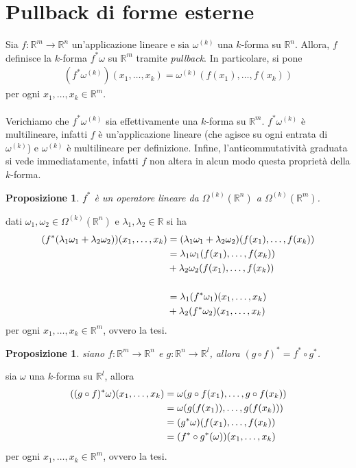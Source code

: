 \documentclass[oneside, 11pt]{amsbook}
\makeatletter
\newcommand{\0}{{(0)}}
\newcommand{\3}{{(3)}}
\theoremstyle{colonplain}
\newtheorem{prop}[thm]{Proposizione}
\theoremstyle{colondefinition}
\theoremstyle{colonremark}
\numberwithin{equation}{chapter}
\renewcommand{\proofname}{Dimostrazione}
\renewenvironment{proof}[1][\proofname]{\par
  \pushQED{\qed}%
  \normalfont \topsep6\p@\@plus6\p@\relax
  \trivlist
  \item[\hskip\labelsep\bfseries #1:]\ignorespaces
}{%
  \popQED\endtrivlist\@endpefalse
}
\makeatother
\begin{document}
\section{Pullback di forme esterne}
Sia $f : \mathbb{R}^m \longrightarrow \mathbb{R}^n$ un'applicazione lineare e sia $\omega^{(k)}$ una $k$-forma su $\mathbb{R}^n$. Allora, $f$ definisce la $k$-forma $f^*\omega$ su $\mathbb{R}^m$ tramite \textit{pullback}. In particolare, si pone
\begin{align}
    (f^*\omega^{(k)})(x_1, \dots, x_k) = \omega^{(k)}(f(x_1), \dots, f(x_k)) 
\end{align}
per ogni $x_1, \dots, x_k \in \mathbb{R}^m$. \\ \\
Verichiamo che $f^*\omega^{(k)}$ sia effettivamente una $k$-forma su $\mathbb{R}^m$. $f^*\omega^{(k)}$ è multilineare, infatti $f$ è un'applicazione lineare (che agisce su ogni entrata di $\omega^{(k)}$) e $\omega^{(k)}$ è multilineare per definizione. Infine, l'anticommutatività graduata si vede immediatamente, infatti $f$ non altera in alcun modo questa proprietà della $k$-forma.
\begin{prop} $f^*$ è un operatore lineare da $\Omega^{(k)}(\mathbb{R}^n)$ a $\Omega^{(k)}(\mathbb{R}^m)$.
\end{prop}
\begin{proof} dati $\omega_1, \omega_2 \in \Omega^{(k)}(\mathbb{R}^n)$ e $\lambda_1, \lambda_2 \in \mathbb{R}$ si ha
\begin{align}
    (f^*(\lambda_1\omega_1 + \lambda_2\omega_2))(x_1, \dots, x_k) &= (\lambda_1\omega_1 + \lambda_2\omega_2)(f(x_1), \dots, f(x_k)) \notag \\
    &= \lambda_1\omega_1(f(x_1), \dots, f(x_k)) \notag \\
    &+ \lambda_2\omega_2(f(x_1), \dots, f(x_k)) \notag \\ \notag \\
    &= \lambda_1(f^*\omega_1)(x_1, \dots, x_k) \notag \\
    &+ \lambda_2(f^*\omega_2)(x_1, \dots, x_k) 
\end{align}
per ogni $x_1, \dots, x_k \in \mathbb{R}^m$, ovvero la tesi.
\end{proof}
\begin{prop} siano $f : \mathbb{R}^m \longrightarrow \mathbb{R}^n$ e $g : \mathbb{R}^n \longrightarrow \mathbb{R}^l$, allora $(g \circ f)^* = f^* \circ g^*$.
\end{prop}
\begin{proof} sia $\omega$ una $k$-forma su $\mathbb{R}^l$, allora 
\begin{align}
    ((g \circ f)^*\omega)(x_1, \dots, x_k) &= \omega(g \circ f(x_1), \dots, g \circ f(x_k)) \notag \\
    &= \omega(g(f(x_1)), \dots, g(f(x_k))) \notag \\
    &= (g^*\omega)(f(x_1), \dots, f(x_k)) \notag \\
    &= (f^* \circ g^*(\omega))(x_1, \dots, x_k) 
\end{align}
per ogni $x_1, \dots, x_k \in \mathbb{R}^m$, ovvero la tesi.
\end{proof}
\end{document}
